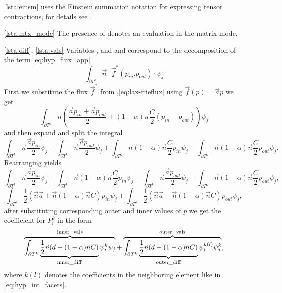 \begin{itemize}
    \item[\ref{lsta:einsm}]  uses the Einstein summation 
    notation for expressing tensor contractions, for details see \cite{einsum-doc}.
    \item[\ref{lsta:mtx_mode}] The presence of  denotes an evaluation 
    in the matrix mode.
    \item[\ref{lsta:diff}, \ref{lsta:vals}] Variables , 
     and  and  correspond to 
    the decomposition of the term \eqref{eq:hyp_flux_app}
    \begin{equation}
        \int_{\partial{T^k}} \vec{n} \cdot \vec{f}^{*} (p_{in}.
            p_{out})\cdot\psi_j
    \end{equation}
    First we substitute the flux $\vec{f}^*$ from ,\eqref{eq:lax-frieflux} using 
    $\vec{f}(p) = \vec{a}p$ we get
    \begin{equation}
        \int_{\partial{T^k}} \vec{n} \left(\frac{\vec{a}p_{in} + \vec{a}p_{out}}{2}  
        + (1-\alpha) \vec{n}\frac{C}{2}(p_{in} - p_{out}) \right)\psi_j
    \end{equation}
    and then expand and split the integral
    \begin{equation}
        \int_{\partial{T^k}} \vec{n}\frac{\vec{a}p_{in}}{2}\psi_j
      + \int_{\partial{T^k}} \vec{n}\frac{\vec{a}p_{out}}{2}\psi_j
      + \int_{\partial{T^k}} \vec{n} (1-\alpha) \vec{n}\frac{C}{2}p_{in}\psi_j
      - \int_{\partial{T^k}} \vec{n} (1-\alpha) \vec{n}\frac{C}{2}p_{out}\psi_j.
    \end{equation}
    Rearranging yields
    \begin{equation}
      \int_{\partial{T^k}} \vec{n}\frac{\vec{a}p_{in}}{2}\psi_j
    + \int_{\partial{T^k}} \vec{n} (1-\alpha) \vec{n}\frac{C}{2}p_{in}\psi_j
    + \int_{\partial{T^k}} \vec{n}\frac{\vec{a}p_{out}}{2}\psi_j
    - \int_{\partial{T^k}} \vec{n} (1-\alpha) \vec{n}\frac{C}{2}p_{out}\psi_j,
    \end{equation}
    \begin{equation}
    \int_{\partial{T^k}}  \frac{1}{2}(\vec{n}\vec{a}
        + \vec{n} (1-\alpha) \vec{n}C)p_{in}\psi_j
    +\int_{\partial{T^k}}  \frac{1}{2}(\vec{n}\vec{a}
        - \vec{n} (1-\alpha) \vec{n}C)p_{out}\psi_j,
    \end{equation}
    after substituting corresponding outer and inner values of $p$ we get the coefficient 
    for $P^k_{i}$ in the form
     \begin{equation}
    \overbrace{\int_{\partial{T^k}}  \underbrace{\frac{1}{2}\vec{n}(\vec{a}
    +  (1-\alpha) 
    \vec{n}C)}_{\text{\pysauce{inner_diff}}}\psi^{k}_i\psi_j}^{\text{\pysauce{inner_vals}}}
    +\overbrace{\int_{\partial{T^k}} \underbrace{ \frac{1}{2}\vec{n}(\vec{a} - (1-\alpha) 
    \vec{n}C)}_{\text{\pysauce{outer_diff}}}\psi^{k(l)}_i\psi^k_j}^{\text{\pysauce{outer_vals}}},
    \end{equation}
    where $k(l)$ denotes the coefficients in the neighboring element like in 
    \eqref{eq:hyp_int_facets}.
\end{itemize}
